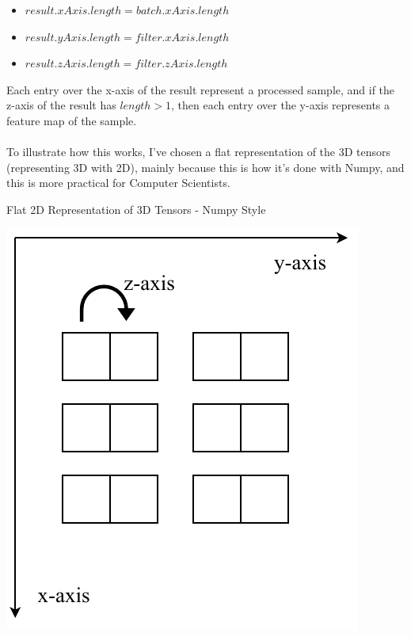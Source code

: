 \documentclass[a4paper, 12pt]{report}
\begin{document}
\begin{itemize}[nosep]
	\item $ result.xAxis.length = batch.xAxis.length $
	\item $ result.yAxis.length = filter.xAxis.length $
	\item $ result.zAxis.length = filter.zAxis.length $
\end{itemize}
Each entry over the x-axis of the result represent a processed sample, and if the z-axis of the result has $ length > 1 $, then each entry over the y-axis represents a feature map of the sample.\\\\
To illustrate how this works, I've chosen a flat representation of the 3D tensors (representing 3D with 2D), mainly because this is how it's done with Numpy, and this is more practical for Computer Scientists.
\begin{blockfigure}{Flat 2D Representation of 3D Tensors - Numpy Style}
		\begin{center}
			\includegraphics[height=0.21\textheight]{numpy-3Dtensor-axis}
		\end{center}
\end{blockfigure}
\newpage
\end{document}
